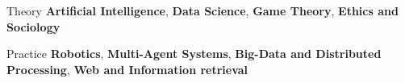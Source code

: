 
\begin{cvskills}

  \cvskill
    {Theory} %
    {\textbf{Artificial Intelligence}, \textbf{Data Science}, \textbf{Game Theory}, \textbf{Ethics and Sociology}} %

  \cvskill
    {Practice} %
    {\textbf{Robotics}, \textbf{Multi-Agent Systems}, \textbf{Big-Data and Distributed Processing}, \textbf{Web and Information retrieval}} %
\end{cvskills}
